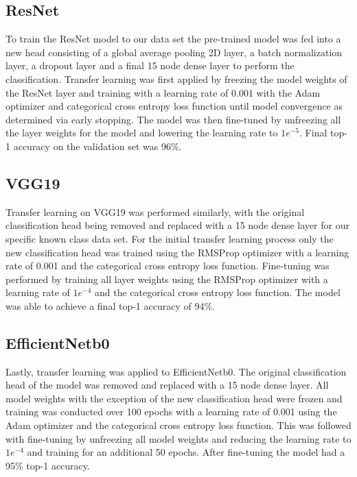 \documentclass[conference]{IEEEtran}
\begin{document}
\subsection{ResNet}

To train the ResNet model to our data set the pre-trained model was fed into a new head consisting of a global average pooling 2D layer, a batch normalization layer, a dropout layer and a final 15 node dense layer to perform the classification. Transfer learning was first applied by freezing the model weights of the ResNet layer and training with a learning rate of 0.001 with the Adam optimizer and categorical cross entropy loss function until model convergence as determined via early stopping. The model was then fine-tuned by unfreezing all the layer weights for the model and lowering the learning rate to $1e^{-5}$. Final top-1 accuracy on the validation set was 96\%.

\subsection{VGG19}

Transfer learning on VGG19 was performed similarly, with the original classification head being removed and replaced with a 15 node dense layer for our specific known class data set. For the initial transfer learning process only the new classification head was trained using the RMSProp optimizer with a learning rate of 0.001 and the categorical cross entropy loss function. Fine-tuning was performed by training all layer weights using the RMSProp optimizer with a learning rate of $1e^{-4}$ and the categorical cross entropy loss function. The model was able to achieve a final top-1 accuracy of 94\%.

\subsection{EfficientNetb0}

Lastly, transfer learning was applied to EfficientNetb0. The original classification head of the model was removed and replaced with a 15 node dense layer. All model weights with the exception of the new classification head were frozen and training was conducted over 100 epochs with a learning rate of 0.001 using the Adam optimizer and the categorical cross entropy loss function. This was followed with fine-tuning by unfreezing all model weights and reducing the learning rate to $1e^{-4}$ and training for an additional 50 epochs. After fine-tuning the model had a 95\% top-1 accuracy.
\end{document}
